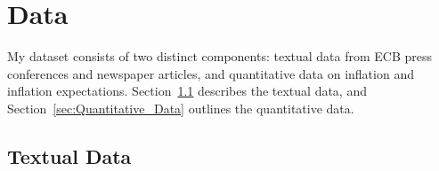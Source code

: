 \documentclass[review]{elsarticle}
\begin{document}

\section{Data} \label{sec:Data}

My dataset consists of two distinct components: textual data from ECB press conferences and newspaper articles, and quantitative data on inflation and inflation expectations. Section~\ref{sec:Textual_Data} describes the textual data, and Section~\ref{sec:Quantitative_Data} outlines the quantitative data.

\subsection{Textual Data} \label{sec:Textual_Data}
\end{document}
